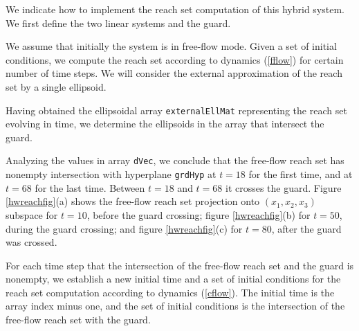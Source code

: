 We indicate how to implement the reach set computation of this hybrid system.
We first define the two linear systems and the guard.

We assume that initially the system is in free-flow mode.
Given a set of initial conditions, we  compute the reach set according
to dynamics (\ref{fflow}) for certain number of time steps.
We will consider the external approximation of the reach set by a single
ellipsoid.

Having obtained the ellipsoidal array {\tt externalEllMat} representing the reach set
evolving in time, we  determine the  ellipsoids in the array that
intersect the guard.

Analyzing the values in array {\tt dVec}, we conclude that the free-flow reach set
has nonempty intersection with hyperplane {\tt grdHyp} at $t=18$
for the first time, and at $t=68$ for the last time.
Between $t=18$ and
$t=68$ it crosses the guard. Figure \ref{hwreachfig}(a) shows the
free-flow reach set projection onto $(x_1,x_2,x_3)$ subspace for $t=10$,
before the guard crossing; figure \ref{hwreachfig}(b) for $t=50$,
during the guard crossing; and figure \ref{hwreachfig}(c) for $t=80$,
after the guard was crossed.

For each time step that the intersection of the free-flow reach set and the
guard is nonempty, we establish a new initial time and a set of initial
conditions for the reach set computation according to dynamics (\ref{cflow}).
The initial time is the array index minus one, and the set of initial
conditions is the intersection of the free-flow reach set with the guard.

